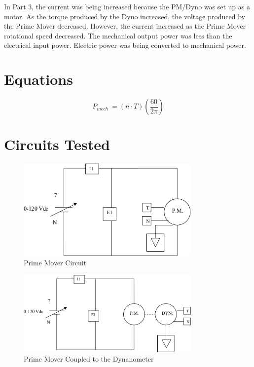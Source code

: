 \documentclass{article}
\begin{document}
In Part 3, the current was being increased because the PM/Dyno was set up as a motor. As the torque produced
by the Dyno increased, the voltage produced by the Prime Mover decreased. However, the current increased as the
Prime Mover rotational speed decreased. The mechanical output power was less than the electrical input power.
Electric power was being converted to mechanical power.

\section*{Equations}

\[P_{mech}\ =  (n \cdot T)\left(\frac{60}{2\pi}\right) \]

\section*{Circuits Tested}

\begin{figure}[H]
  \centering
  \includegraphics[width=0.8\textwidth]{img/circuit_01}
  \caption{Prime Mover Circuit}
  \label{fig:circuit_01}
\end{figure}

\begin{figure}[H]
  \centering
  \includegraphics[width=0.8\textwidth]{img/circuit_02}
  \caption{Prime Mover Coupled to the Dynanometer}
  \label{fig:circuit_02}
\end{figure}
\end{document}
